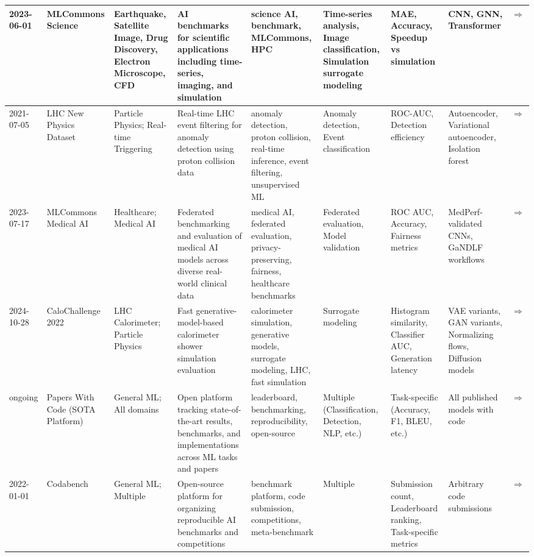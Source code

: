 \documentclass{article}
\begin{document}
\begin{landscape}
\begin{longtable}{|p{2cm}|p{2cm}|p{2cm}|p{2cm}|p{2cm}|p{2cm}|p{2cm}|p{2cm}|p{2cm}|}
2023-06-01 & MLCommons Science & Earthquake, Satellite Image, Drug Discovery, Electron Microscope, CFD & AI benchmarks for scientific applications including time-series, imaging, and simulation & science AI, benchmark, MLCommons, HPC & Time-series analysis, Image classification, Simulation surrogate modeling & MAE, Accuracy, Speedup vs simulation & CNN, GNN, Transformer & \cite{mlcommons_science2023}\href{https://github.com/mlcommons/science}{$\Rightarrow$} \\ \hline
2021-07-05 & LHC New Physics Dataset & Particle Physics; Real-time Triggering & Real-time LHC event filtering for anomaly detection using proton collision data & anomaly detection, proton collision, real-time inference, event filtering, unsupervised ML & Anomaly detection, Event classification & ROC-AUC, Detection efficiency & Autoencoder, Variational autoencoder, Isolation forest & \cite{govorkova2022lhcnewphysics}\href{https://arxiv.org/pdf/2107.02157}{$\Rightarrow$} \\ \hline
2023-07-17 & MLCommons Medical AI & Healthcare; Medical AI & Federated benchmarking and evaluation of medical AI models across diverse real-world clinical data & medical AI, federated evaluation, privacy-preserving, fairness, healthcare benchmarks & Federated evaluation, Model validation & ROC AUC, Accuracy, Fairness metrics & MedPerf-validated CNNs, GaNDLF workflows & \cite{karargyris2023federated}\href{https://github.com/mlcommons/medical}{$\Rightarrow$} \\ \hline
2024-10-28 & CaloChallenge 2022 & LHC Calorimeter; Particle Physics & Fast generative-model-based calorimeter shower simulation evaluation & calorimeter simulation, generative models, surrogate modeling, LHC, fast simulation & Surrogate modeling & Histogram similarity, Classifier AUC, Generation latency & VAE variants, GAN variants, Normalizing flows, Diffusion models & \cite{krause2024calochallenge}\href{http://arxiv.org/abs/2410.21611}{$\Rightarrow$} \\ \hline
ongoing & Papers With Code (SOTA Platform) & General ML; All domains & Open platform tracking state-of-the-art results, benchmarks, and implementations across ML tasks and papers & leaderboard, benchmarking, reproducibility, open-source & Multiple (Classification, Detection, NLP, etc.) & Task-specific (Accuracy, F1, BLEU, etc.) & All published models with code & \cite{pwc2025}\href{https://paperswithcode.com/sota}{$\Rightarrow$} \\ \hline
2022-01-01 & Codabench & General ML; Multiple & Open-source platform for organizing reproducible AI benchmarks and competitions & benchmark platform, code submission, competitions, meta-benchmark & Multiple & Submission count, Leaderboard ranking, Task-specific metrics & Arbitrary code submissions & \cite{xu2021codabench}\href{https://www.codabench.org/}{$\Rightarrow$} \\ \hline

\end{longtable}
\end{landscape}
\end{document}

